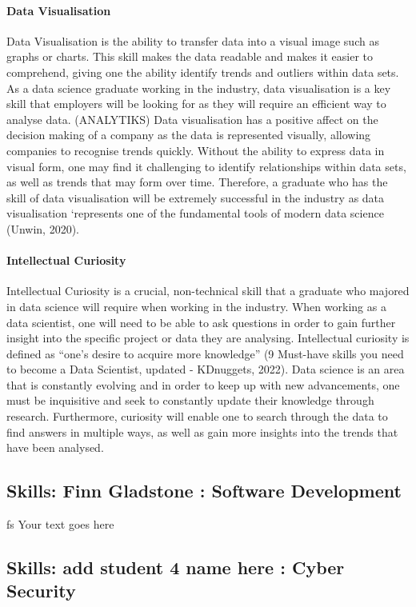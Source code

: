 \documentclass[a4paper, 11pt]{report}
\begin{document}
\paragraph {Data Visualisation} Data Visualisation is the ability to transfer data into a visual image such as graphs or charts. This skill makes the data readable and makes it easier to comprehend, giving one the ability identify trends and outliers within data sets. As a data science graduate working in the industry, data visualisation is a key skill that employers will be looking for as they will require an efficient way to analyse data. (ANALYTIKS) Data visualisation has a positive affect on the decision making of a company as the data is represented visually, allowing companies to recognise trends quickly. Without the ability to express data in visual form, one may find it challenging to identify relationships within data sets, as well as trends that may form over time. Therefore, a graduate who has the skill of data visualisation will be extremely successful in the industry as data visualisation ‘represents one of the fundamental tools of modern data science (Unwin, 2020).

\paragraph {Intellectual Curiosity} Intellectual Curiosity is a crucial, non-technical skill that a graduate who majored in data science will require when working in the industry. When working as a data scientist, one will need to be able to ask questions in order to gain further insight into the specific project or data they are analysing. Intellectual curiosity is defined as “one’s desire to acquire more knowledge” (9 Must-have skills you need to become a Data Scientist, updated - KDnuggets, 2022). Data science is an area that is constantly evolving and in order to keep up with new advancements, one must be inquisitive and seek to constantly update their knowledge through research. Furthermore, curiosity will enable one to search through the data to find answers in multiple ways, as well as gain more insights into the trends that have been analysed. 

\subsection{Skills: Finn Gladstone : Software Development}
fs
Your text goes here

\subsection{Skills: add student 4 name here : Cyber Security}
\end{document}
